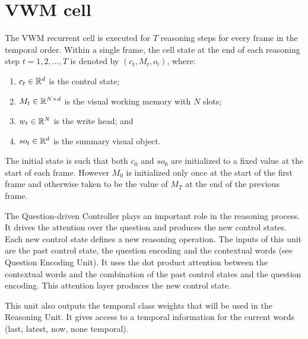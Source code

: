 \hrulefill

\section{VWM cell}

The VWM recurrent cell is executed for $T$ reasoning steps for every frame in
the temporal order.  Within a single frame, the cell state at the end of each reasoning step 
$t=1,2, \dots, T$ is denoted by $(c_t, M_t, o_t)$, where: 
\begin{enumerate}
	\item $c_t \in \mathbb{R}^d$ is the control state;
	\item $M_t \in  \mathbb{R}^{N \times d}$ is the visual working memory with $N$ slots;
	\item $w_t \in  \mathbb{R}^N$ is the write head; and
	\item $so_t  \in \mathbb{R}^d$ is the summary visual object.
\end{enumerate} 
The initial state is such that both $c_0$ and $so_0$ are initialized
to a fixed value at the start of each frame. However $M_0$ is initialized only once at
the start of the first frame and otherwise taken to be the value of $M_T$ at the
end of the previous frame.



The Question-driven Controller plays an important role in the reasoning process.
It drives the attention over the question and produces the new control states. Each new control state defines a new reasoning operation. The inputs of this unit are the past control state, the question encoding and the contextual words (see Question Encoding Unit). It uses the dot product attention between the contextual words
and the combination of the past control states and the question encoding.  This attention layer produces the new control state.

This unit also outputs the temporal class weights that will be used in the Reasoning Unit. It gives access to a temporal information for the current words (last, latest, now, none temporal).

